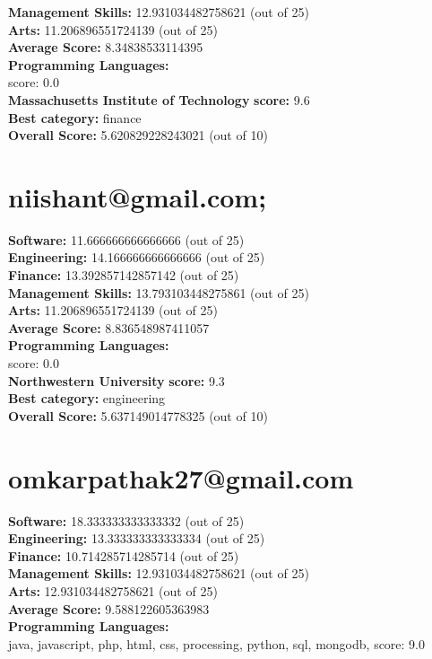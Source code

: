 \documentclass{article}
\begin{document}
\textbf{Management Skills:} 12.931034482758621 (out of 25)\\
\textbf{Arts:} 11.206896551724139 (out of 25)\\
\textbf{Average Score: } 8.34838533114395\\
\textbf{Programming Languages:} \\
score: 0.0\\
\textbf{Massachusetts Institute of Technology} \textbf{score:} 9.6\\
\textbf{Best category: } finance\\
\textbf{Overall Score: }5.620829228243021 (out of 10)\section{niishant@gmail.com;}
\textbf{Software:} 11.666666666666666 (out of 25)\\
\textbf{Engineering: } 14.166666666666666 (out of 25)\\
\textbf{Finance:} 13.392857142857142 (out of 25)\\
\textbf{Management Skills:} 13.793103448275861 (out of 25)\\
\textbf{Arts:} 11.206896551724139 (out of 25)\\
\textbf{Average Score: } 8.836548987411057\\
\textbf{Programming Languages:} \\
score: 0.0\\
\textbf{Northwestern University} \textbf{score:} 9.3\\
\textbf{Best category: } engineering\\
\textbf{Overall Score: }5.637149014778325 (out of 10)\section{omkarpathak27@gmail.com}
\textbf{Software:} 18.333333333333332 (out of 25)\\
\textbf{Engineering: } 13.333333333333334 (out of 25)\\
\textbf{Finance:} 10.714285714285714 (out of 25)\\
\textbf{Management Skills:} 12.931034482758621 (out of 25)\\
\textbf{Arts:} 12.931034482758621 (out of 25)\\
\textbf{Average Score: } 9.588122605363983\\
\textbf{Programming Languages:} \\
java, javascript, php, html, css, processing, python, sql, mongodb, score: 9.0\\
\end{document}
